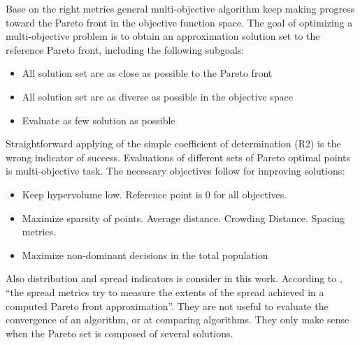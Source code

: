         Base on the right metrics general multi-objective algorithm keep making progress toward the Pareto front in the objective function space.
        The goal of optimizing a multi-objective problem is to obtain an approximation solution set to the reference Pareto front, including the following subgoals:
        \begin{itemize}
            \item All solution set are as close as possible to the Pareto front
            \item All solution set are as diverse as possible in the objective space
            \item Evaluate as few solution as possible
        \end{itemize}
        Straightforward applying of the simple coefficient of determination (R2) is the wrong indicator of success. Evaluations of different sets of Pareto optimal points is multi-objective task.
        The necessary objectives follow for improving solutions:
        \begin{itemize}
            \item Keep hypervolume low. Reference point is 0 for all objectives.
            \item Maximize sparsity of points. Average distance. Crowding Distance. Spacing metrics.
            \item Maximize non-dominant decisions in the total population
        \end{itemize}

        Also distribution and spread indicators is consider in this work. According to \cite{CustodioMVV11}, “the spread metrics try to measure the extents of the spread achieved in a computed Pareto front approximation”. They are not useful to evaluate the convergence of an algorithm, or at comparing algorithms. They only make sense when the Pareto set is composed of several solutions.

